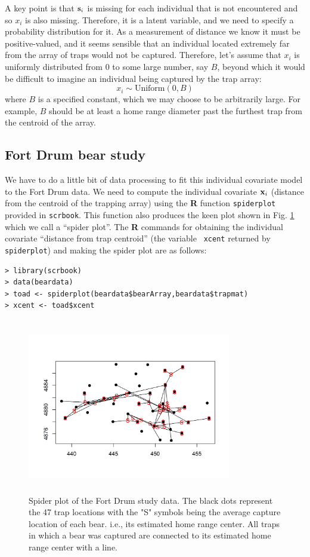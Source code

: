 A key point is that ${\bf s}_{i}$ is missing for each individual that
is not encountered and so $x_{i}$ is also missing. Therefore, it is a
latent variable, and we need to specify a probability distribution for
it.  As a measurement of distance we know it must be positive-valued,
and it seems sensible that an individual located extremely far from
the array of traps would not be captured.  Therefore, let's assume
that $x_{i}$ is uniformly distributed from $0$ to some large number,
say $B$, beyond which it would be difficult to imagine an individual
being captured by the trap array:
\[
 x_{i} \sim \mbox{Uniform}(0,B)
\]
where $B$ is a specified constant, which we may choose to be
arbitrarily large.
For example, $B$ should be at least a home
range diameter past the furthest trap from the centroid of the array.


\subsection{Fort Drum bear study}


We have to do a little bit of data processing to fit this individual
covariate model to the Fort Drum data.  We need to compute the
individual covariate ${\bf x}_{i}$ (distance from the centroid of the
trapping array) using the {\bf R} function \mbox{\tt spiderplot}
provided in \mbox{\tt scrbook}. This function also produces the keen
plot shown in Fig. \ref{closed.fig.spiderplot} which we call a
``spider plot''.  The {\bf R} commands for obtaining the individual
covariate ``distance from trap centroid'' (the variable \mbox{\tt
  xcent} returned by \mbox{\tt spiderplot}) and making the spider plot
are as follows:
\begin{verbatim}
> library(scrbook)
> data(beardata)
> toad <- spiderplot(beardata$bearArray,beardata$trapmat)
> xcent <- toad$xcent
\end{verbatim}

\begin{figure}[ht]
\centering
\includegraphics[height=3.0in,width=3.5in]{Ch4-Closed/figs/bear_spiderplot}
\caption{Spider plot of the Fort Drum study data.
The black dots represent the 47 trap locations with the "S" symbols
being the average capture location of each bear. i.e., its estimated home
range center. All traps in which a bear was captured are connected to
its estimated home range center with a line.
}
\label{closed.fig.spiderplot}
\end{figure}

